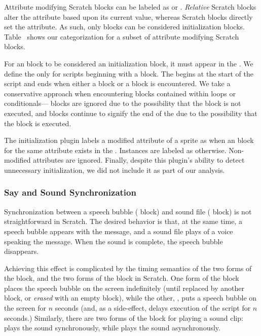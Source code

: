 Attribute modifying Scratch blocks can be labeled as \rel{} or
\abs{}. \emph{Relative} Scratch blocks alter the attribute based upon its
current value, whereas \abs{} Scratch blocks directly set the attribute. As
such, only \abs{} blocks can be considered initialization
blocks. Table~ shows our categorization for a
subset of attribute modifying Scratch blocks.

For an \abs{} block to be considered an initialization block, it must appear in
the \initzone{}. We define the \initzone{} only for scripts beginning with a
\greenflag{} block. The \initzone{} begins at the start of the script and ends
when either a \rel{} block or a \broadcast{} block is encountered. We take a
conservative approach when encountering blocks contained within loops or
conditionals---\abs{} blocks are ignored due to the possibility that the block
is not executed, and \rel{} blocks continue to signify the end of the
\initzone{} due to the possibility that the block is executed.

The initialization plugin labels a modified attribute of a sprite as \correct{}
when an \abs{} block for the same attribute exists in the
\initzone{}. Instances are labeled as \incor{} otherwise. Non-modified
attributes are ignored. Finally, despite this plugin's ability to detect
unnecessary initialization, we did not include it as part of our analysis.


\subsubsection{Say and Sound Synchronization}
Synchronization between a speech bubble (\say{} block) and sound file
(\playsound{} block) is not straightforward in Scratch.  The desired behavior
is that, at the same time, a speech bubble appears with the message, and a
sound file plays of a voice speaking the message.  When the sound is complete,
the speech bubble disappears.

Achieving this effect is complicated by the timing semantics of the two forms
of the \say{} block, and the two forms of the \playsound{} block in Scratch.
One form of the \say{} block places the speech bubble on the screen
indefinitely (until replaced by another \say{} block, or \emph{erased} with an
empty \say{} block), while the other, \sayfor{}, puts a speech bubble on the
screen for $n$ seconds (and, as a side-effect, delays execution of the script
for $n$ seconds.)  Similarly, there are two forms of the block for playing a
sound clip: \playsounddone{} plays the sound synchronously, while \playsound{}
plays the sound asynchronously.

